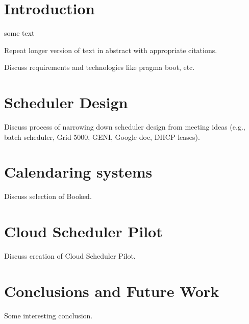 \documentclass{acm_proc_article-sp}
\begin{document}


\section{Introduction}

some text~\cite{pragmaWeb}

Repeat longer version of text in abstract with appropriate citations.

Discuss requirements and technologies like pragma boot, etc.


\section{Scheduler Design}

Discuss process of narrowing down scheduler design from meeting ideas 
(e.g., batch scheduler, Grid 5000, GENI, Google doc, DHCP leases).

\section{Calendaring systems}

Discuss selection of Booked.

\section{Cloud Scheduler Pilot}

Discuss creation of Cloud Scheduler Pilot.

\section{Conclusions and Future Work}

Some interesting conclusion.



  
\end{document}
